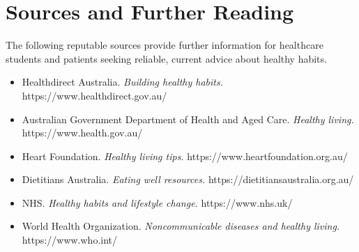 \section*{Sources and Further Reading}
The following reputable sources provide further information for healthcare students and patients seeking reliable, current advice about healthy habits.

\begin{itemize}
    \item Healthdirect Australia. \textit{Building healthy habits.} https://www.healthdirect.gov.au/
    \item Australian Government Department of Health and Aged Care. \textit{Healthy living.} https://www.health.gov.au/
    \item Heart Foundation. \textit{Healthy living tips.} https://www.heartfoundation.org.au/
    \item Dietitians Australia. \textit{Eating well resources.} https://dietitiansaustralia.org.au/
    \item NHS. \textit{Healthy habits and lifestyle change.} https://www.nhs.uk/
    \item World Health Organization. \textit{Noncommunicable diseases and healthy living.} https://www.who.int/
\end{itemize}
